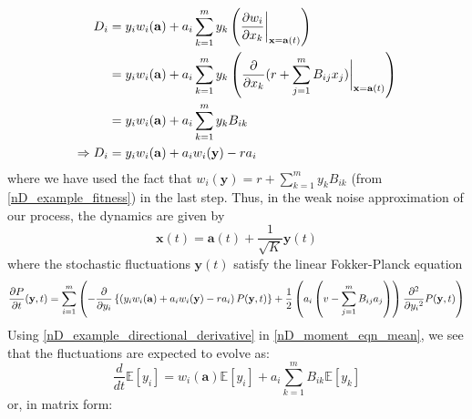 \begin{align}
D_i &= y_iw_i(\mathbf{a}) + a_i\sum\limits_{k=1}^{m}y_k\left(\frac{\partial w_i}{\partial x_k}\bigg{|}_{\mathbf{x}=\mathbf{a}(t)}\right)\\
&= y_iw_i(\mathbf{a}) + a_i\sum\limits_{k=1}^{m}y_k\left(\frac{\partial}{\partial x_k}(r+\sum\limits_{j=1}^{m}B_{ij}x_j)\bigg{|}_{\mathbf{x}=\mathbf{a}(t)}\right)\\
&= y_iw_i(\mathbf{a}) + a_i\sum\limits_{k=1}^{m}y_kB_{ik}\\
\Rightarrow D_i &= y_iw_i(\mathbf{a}) + a_iw_i(\mathbf{y}) - ra_i\label{nD_example_directional_derivative}
\end{align}
where we have used the fact that $w_i(\mathbf{y}) = r + \sum\limits_{k=1}^{m}y_kB_{ik}$ (from \eqref{nD_example_fitness}) in the last step. Thus, in the weak noise approximation of our process, the dynamics are given by
\begin{equation}
\mathbf{x}(t) = \mathbf{a}(t) + \frac{1}{\sqrt{K}}\mathbf{y}(t)
\end{equation}
where the stochastic fluctuations $\mathbf{y}(t)$ satisfy the linear Fokker-Planck equation
\begin{equation}
\resizebox{1.1\textwidth}{!}{$\displaystyle\frac{\partial P}{\partial t}(\mathbf{y},t) = \sum\limits_{i=1}^{m}\left(-\frac{\partial}{\partial y_i}\left\{\left(y_iw_i(\mathbf{a}) + a_iw_i(\mathbf{y}) - ra_i\right)P(\mathbf{y},t)\right\}+\frac{1}{2}\left(a_i\left(v - \sum\limits_{j=1}^{m}B_{ij}a_j\right)\right)\frac{\partial^2}{\partial{y_i}^2}P(\mathbf{y},t)\right)$}
\end{equation}
Using \eqref{nD_example_directional_derivative} in \eqref{nD_moment_eqn_mean}, we see that the fluctuations are expected to evolve as:
\begin{equation}
\label{nD_example_moment_eqn_mean}
\frac{d}{dt}\mathbb{E}[y_i] = w_i(\mathbf{a})\mathbb{E}[y_i] + a_i\sum\limits_{k=1}^{m}B_{ik}\mathbb{E}[y_k]
\end{equation}
or, in matrix form:
